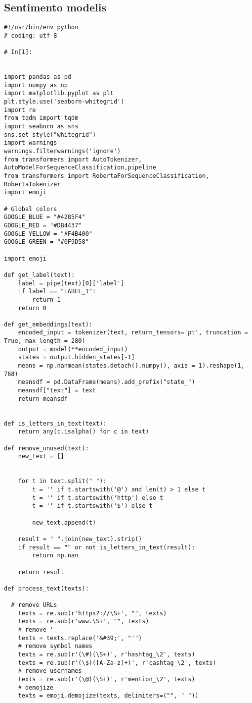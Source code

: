 \documentclass[12pt,a4paper]{article}
\begin{document}
\subsection{Sentimento modelis}
\begin{lstlisting}[breaklines]
#!/usr/bin/env python
# coding: utf-8

# In[1]:


import pandas as pd
import numpy as np
import matplotlib.pyplot as plt
plt.style.use('seaborn-whitegrid')
import re
from tqdm import tqdm
import seaborn as sns
sns.set_style("whitegrid")
import warnings
warnings.filterwarnings('ignore')
from transformers import AutoTokenizer, AutoModelForSequenceClassification,pipeline
from transformers import RobertaForSequenceClassification, RobertaTokenizer
import emoji

# Global colors
GOOGLE_BLUE = "#4285F4"
GOOGLE_RED = "#DB4437"
GOOGLE_YELLOW = "#F4B400"
GOOGLE_GREEN = "#0F9D58"

import emoji

def get_label(text):
    label = pipe(text)[0]['label']
    if label == "LABEL_1":
        return 1
    return 0

def get_embeddings(text):
    encoded_input = tokenizer(text, return_tensors='pt', truncation = True, max_length = 280)
    output = model(**encoded_input)
    states = output.hidden_states[-1]
    means = np.nanmean(states.detach().numpy(), axis = 1).reshape(1, 768)
    meansdf = pd.DataFrame(means).add_prefix("state_")
    meansdf["text"] = text
    return meansdf
    
    
def is_letters_in_text(text):
    return any(c.isalpha() for c in text)

def remove_unused(text):
    new_text = []
 
 
    for t in text.split(" "):
        t = '' if t.startswith('@') and len(t) > 1 else t
        t = '' if t.startswith('http') else t
        t = '' if t.startswith('$') else t
        
        new_text.append(t)
    
    result = " ".join(new_text).strip()
    if result == "" or not is_letters_in_text(result):
        return np.nan
    
    return result

def process_text(texts):

  # remove URLs
    texts = re.sub(r'https?://\S+', "", texts)
    texts = re.sub(r'www.\S+', "", texts)
    # remove '
    texts = texts.replace('&#39;', "'")
    # remove symbol names
    texts = re.sub(r'(\#)(\S+)', r'hashtag_\2', texts)
    texts = re.sub(r'(\$)([A-Za-z]+)', r'cashtag_\2', texts)
    # remove usernames
    texts = re.sub(r'(\@)(\S+)', r'mention_\2', texts)
    # demojize
    texts = emoji.demojize(texts, delimiters=("", " "))
    

\end{lstlisting}
\end{document}
